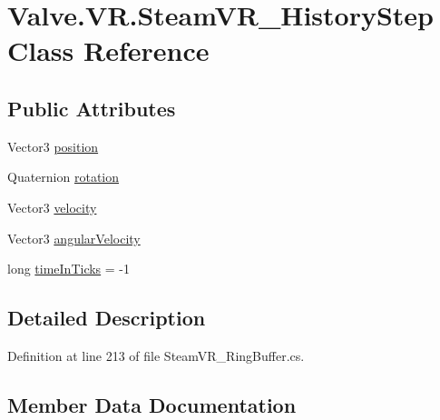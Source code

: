 \hypertarget{class_valve_1_1_v_r_1_1_steam_v_r___history_step}{}\section{Valve.\+V\+R.\+Steam\+V\+R\+\_\+\+History\+Step Class Reference}
\label{class_valve_1_1_v_r_1_1_steam_v_r___history_step}
\subsection*{Public Attributes}
\begin{DoxyCompactItemize}
\item 
Vector3 \mbox{\hyperlink{class_valve_1_1_v_r_1_1_steam_v_r___history_step_aa217e0594e9faa3899c2bdbaa167f296}{position}}
\item 
Quaternion \mbox{\hyperlink{class_valve_1_1_v_r_1_1_steam_v_r___history_step_a0588b01aff8d1780c62ce01fcf451933}{rotation}}
\item 
Vector3 \mbox{\hyperlink{class_valve_1_1_v_r_1_1_steam_v_r___history_step_ad406c71ee18576cbcd13760d6cc4aa16}{velocity}}
\item 
Vector3 \mbox{\hyperlink{class_valve_1_1_v_r_1_1_steam_v_r___history_step_a7fd0332bdbb1770c61dab180d976e79a}{angular\+Velocity}}
\item 
long \mbox{\hyperlink{class_valve_1_1_v_r_1_1_steam_v_r___history_step_a712c830dad2e643892286d6acbb88e3c}{time\+In\+Ticks}} = -\/1
\end{DoxyCompactItemize}


\subsection{Detailed Description}


Definition at line 213 of file Steam\+V\+R\+\_\+\+Ring\+Buffer.\+cs.



\subsection{Member Data Documentation}
\mbox{\label{class_valve_1_1_v_r_1_1_steam_v_r___history_step_a7fd0332bdbb1770c61dab180d976e79a}} 
